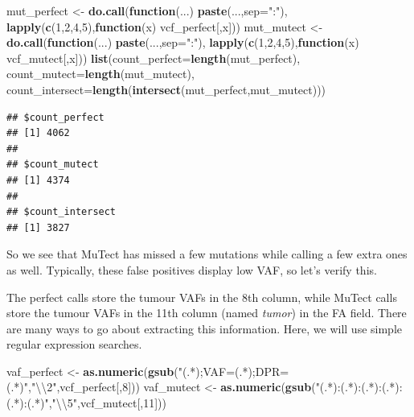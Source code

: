 \documentclass[]{article}
\newenvironment{Shaded}{\begin{snugshade}}{\end{snugshade}}
\newcommand{\CharTok}[1]{\textcolor[rgb]{0.31,0.60,0.02}{#1}}
\newcommand{\ControlFlowTok}[1]{\textcolor[rgb]{0.13,0.29,0.53}{\textbf{#1}}}
\newcommand{\DataTypeTok}[1]{\textcolor[rgb]{0.13,0.29,0.53}{#1}}
\newcommand{\DecValTok}[1]{\textcolor[rgb]{0.00,0.00,0.81}{#1}}
\newcommand{\KeywordTok}[1]{\textcolor[rgb]{0.13,0.29,0.53}{\textbf{#1}}}
\newcommand{\NormalTok}[1]{#1}
\newcommand{\StringTok}[1]{\textcolor[rgb]{0.31,0.60,0.02}{#1}}
\begin{document}
\begin{Shaded}
\begin{Highlighting}[]
\NormalTok{mut_perfect <-}\StringTok{ }\KeywordTok{do.call}\NormalTok{(}\ControlFlowTok{function}\NormalTok{(...) }\KeywordTok{paste}\NormalTok{(...,}\DataTypeTok{sep=}\StringTok{":"}\NormalTok{),}
                       \KeywordTok{lapply}\NormalTok{(}\KeywordTok{c}\NormalTok{(}\DecValTok{1}\NormalTok{,}\DecValTok{2}\NormalTok{,}\DecValTok{4}\NormalTok{,}\DecValTok{5}\NormalTok{),}\ControlFlowTok{function}\NormalTok{(x) vcf_perfect[,x]))}
\NormalTok{mut_mutect <-}\StringTok{ }\KeywordTok{do.call}\NormalTok{(}\ControlFlowTok{function}\NormalTok{(...) }\KeywordTok{paste}\NormalTok{(...,}\DataTypeTok{sep=}\StringTok{":"}\NormalTok{),}
                      \KeywordTok{lapply}\NormalTok{(}\KeywordTok{c}\NormalTok{(}\DecValTok{1}\NormalTok{,}\DecValTok{2}\NormalTok{,}\DecValTok{4}\NormalTok{,}\DecValTok{5}\NormalTok{),}\ControlFlowTok{function}\NormalTok{(x) vcf_mutect[,x]))}
\KeywordTok{list}\NormalTok{(}\DataTypeTok{count_perfect=}\KeywordTok{length}\NormalTok{(mut_perfect),}
     \DataTypeTok{count_mutect=}\KeywordTok{length}\NormalTok{(mut_mutect),}
     \DataTypeTok{count_intersect=}\KeywordTok{length}\NormalTok{(}\KeywordTok{intersect}\NormalTok{(mut_perfect,mut_mutect)))}
\end{Highlighting}
\end{Shaded}

\begin{verbatim}
## $count_perfect
## [1] 4062
## 
## $count_mutect
## [1] 4374
## 
## $count_intersect
## [1] 3827
\end{verbatim}

So we see that MuTect has missed a few mutations while calling a few
extra ones as well. Typically, these false positives display low VAF, so
let's verify this.

The perfect calls store the tumour VAFs in the 8th column, while MuTect
calls store the tumour VAFs in the 11th column (named \emph{tumor}) in
the FA field. There are many ways to go about extracting this
information. Here, we will use simple regular expression searches.

\begin{Shaded}
\begin{Highlighting}[]
\NormalTok{vaf_perfect <-}\StringTok{ }\KeywordTok{as.numeric}\NormalTok{(}\KeywordTok{gsub}\NormalTok{(}\StringTok{"(.*);VAF=(.*);DPR=(.*)"}\NormalTok{,}\StringTok{"}\CharTok{\textbackslash{}\textbackslash{}}\StringTok{2"}\NormalTok{,vcf_perfect[,}\DecValTok{8}\NormalTok{]))}
\NormalTok{vaf_mutect <-}\StringTok{ }\KeywordTok{as.numeric}\NormalTok{(}\KeywordTok{gsub}\NormalTok{(}\StringTok{"(.*):(.*):(.*):(.*):(.*):(.*)"}\NormalTok{,}\StringTok{"}\CharTok{\textbackslash{}\textbackslash{}}\StringTok{5"}\NormalTok{,vcf_mutect[,}\DecValTok{11}\NormalTok{]))}
\end{Highlighting}
\end{Shaded}
\end{document}
